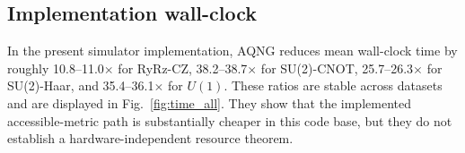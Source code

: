 \subsection{Implementation wall-clock}
In the present simulator implementation, AQNG reduces mean wall-clock time by roughly 10.8--11.0$\times$ for RyRz-CZ, 38.2--38.7$\times$ for SU(2)-CNOT, 25.7--26.3$\times$ for SU(2)-Haar, and 35.4--36.1$\times$ for $U(1)$. These ratios are stable across datasets and are displayed in Fig.~\ref{fig:time_all}. They show that the implemented accessible-metric path is substantially cheaper in this code base, but they do not establish a hardware-independent resource theorem.


